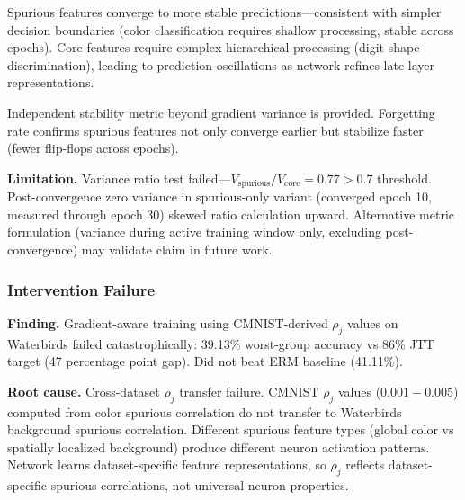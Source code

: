 Spurious features converge to more stable predictions---consistent with simpler decision boundaries (color classification requires shallow processing, stable across epochs). Core features require complex hierarchical processing (digit shape discrimination), leading to prediction oscillations as network refines late-layer representations.

Independent stability metric beyond gradient variance is provided. Forgetting rate confirms spurious features not only converge earlier but stabilize faster (fewer flip-flops across epochs).

\textbf{Limitation.} Variance ratio test failed---$V_{\text{spurious}} / V_{\text{core}} = 0.77 > 0.7$ threshold. Post-convergence zero variance in spurious-only variant (converged epoch 10, measured through epoch 30) skewed ratio calculation upward. Alternative metric formulation (variance during active training window only, excluding post-convergence) may validate claim in future work.

\subsubsection{Intervention Failure}

\textbf{Finding.} Gradient-aware training using CMNIST-derived $\rho_j$ values on Waterbirds failed catastrophically: 39.13\% worst-group accuracy vs 86\% JTT target (47 percentage point gap). Did not beat ERM baseline (41.11\%).

\begin{table}[htbp]
\centering
{}
\end{table}

\textbf{Root cause.} Cross-dataset $\rho_j$ transfer failure. CMNIST $\rho_j$ values ($0.001-0.005$) computed from color spurious correlation do not transfer to Waterbirds background spurious correlation. Different spurious feature types (global color vs spatially localized background) produce different neuron activation patterns. Network learns dataset-specific feature representations, so $\rho_j$ reflects dataset-specific spurious correlations, not universal neuron properties.

